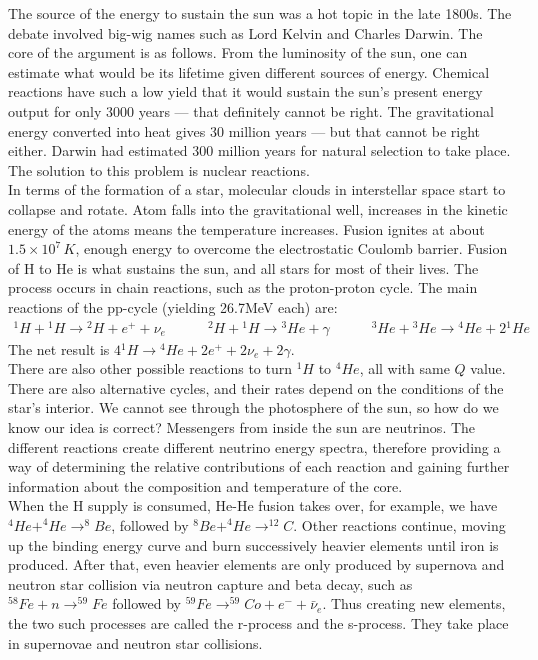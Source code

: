 \documentclass[11pt]{article}
\theoremstyle{break}
\theoremstyle{break}
\begin{document}
The source of the energy to sustain the sun was a hot topic in the late 1800s. The debate involved big-wig names such as Lord Kelvin and Charles Darwin. The core of the argument is as follows. From the luminosity of the sun, one can estimate what would be its lifetime given different sources of energy. Chemical reactions have such a low yield that it would sustain the sun's present energy output for only 3000 years — that definitely cannot be right.
The gravitational energy converted into heat gives 30 million years — but that cannot be right either. Darwin had estimated 300 million years for natural selection to take place. The solution to this problem is nuclear reactions. \\

In terms of the formation of a star, molecular clouds in interstellar space start to collapse and rotate. Atom falls into the gravitational well, increases in the kinetic energy of the atoms means the temperature increases. Fusion ignites at about $1.5 \times 10^7\, K$, enough energy to overcome the electrostatic Coulomb barrier. Fusion of H to He is what sustains the sun, and all stars for most of their lives. The process occurs in chain reactions, such as the proton-proton cycle. The main reactions of the pp-cycle (yielding 26.7MeV each) are:
\begin{align*}
^1 H+{}^1 H \to {}^2 H +e^+ + \nu_e \qquad\quad ^2H + {}^1H \to {}^3He + \gamma \qquad\quad ^3He+{}^3He \to {}^4He + 2 {}^1He
\end{align*}
The net result is $4{}^1H \to {}^4He + 2e^+ + 2\nu_e + 2\gamma$.\\

There are also other possible reactions to turn $^1H$ to $^4He$, all with same $Q$ value. There are also alternative cycles, and their rates depend on the conditions of the star's interior. We cannot see through the photosphere of the sun, so how do we know our idea is correct? Messengers from inside the sun are neutrinos. The different reactions create different neutrino energy spectra, therefore providing a way  of determining  the relative contributions of each reaction and gaining further information about the composition and temperature of the core.\\

When the H supply is consumed, He-He fusion takes over, for example, we have $^4He + ^4He \to ^8 Be$, followed by $^8Be + ^4He \to ^{12}C$. Other reactions continue, moving up the binding energy curve and burn successively heavier elements until iron is produced. After that, even heavier elements are only produced by supernova and neutron star collision via neutron capture and beta decay, such as $^{58}Fe + n \to ^{59}Fe$ followed by $^{59}Fe\to ^{59}Co +e^- +\bar{\nu}_e$. Thus creating new elements, the two such processes are called the r-process and the s-process. They take place in supernovae and neutron star collisions.  \\
\end{document}

